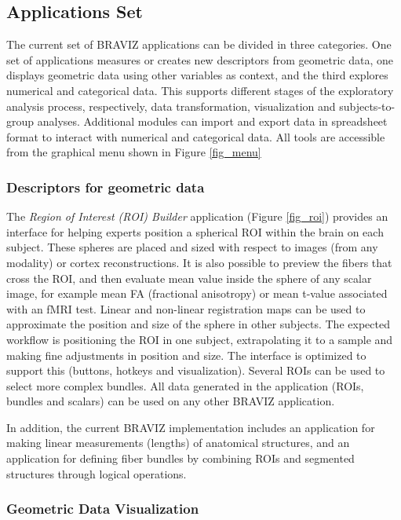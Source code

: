 \documentclass{frontiersHLTH}
\begin{document}
\subsection{Applications Set}


The current set of BRAVIZ applications can be divided in three categories. One set of applications measures or creates new descriptors from geometric data, one displays geometric data using other variables as context, and the third explores numerical and categorical data. This supports different stages of the exploratory analysis process, respectively, data transformation, visualization and subjects-to-group analyses. Additional modules can import and export data in spreadsheet format to interact with numerical and categorical data. All tools  are accessible from the graphical menu shown in Figure \ref{fig_menu}


\subsubsection{Descriptors for geometric data}

The \emph{Region of Interest (ROI) Builder} application (Figure \ref{fig_roi}) provides an interface for helping experts position a spherical ROI within the brain on each subject. These spheres are placed and sized with respect to images (from any modality) or cortex reconstructions. It is also possible to preview the fibers that cross the ROI, and then evaluate mean value inside the sphere of any scalar image, for example mean FA (fractional anisotropy) or mean t-value associated with an fMRI test. 
Linear and non-linear registration maps can be used to approximate the position and size of the sphere in other subjects. The expected workflow is positioning the ROI in one subject, extrapolating it to a sample and making fine adjustments in position and size. The interface is optimized to support this (buttons, hotkeys and visualization). Several ROIs can be used to select more complex bundles. All data generated in the application (ROIs, bundles and scalars) can be used on any other BRAVIZ application. 

In addition, the current BRAVIZ implementation includes an application for making linear measurements (lengths) of anatomical structures, and an application for defining fiber bundles by combining ROIs and segmented structures through logical operations.


\subsubsection{Geometric Data Visualization}
\end{document}
